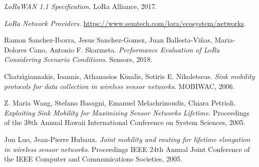 \documentclass[a4paper,12pt]{article}
\theoremstyle{definition}
\begin{document}
\begin{thebibliography}{0}

\textit{LoRaWAN 1.1 Specification}.
LoRa Alliance, 2017.

\textit{LoRa Network Providers}.
\url{https://www.semtech.com/lora/ecosystem/networks}.

Ramon Sanchez-Iborra, Jesus Sanchez-Gomez, Juan Ballesta-Viñas, Maria-Dolores Cano, Antonio F. Skarmeta.
\textit{Performance Evaluation of LoRa Considering Scenario Conditions}. 
Sensors, 2018.

Chatzigiannakis, Ioannis, Athanasios Kinalis, Sotiris E. Nikoletseas.
\textit{Sink mobility protocols for data collection in wireless sensor networks}.
MOBIWAC, 2006.

Z. Maria Wang, Stefano Basagni, Emanuel Melachrinoudis, Chiara Petrioli.
\textit{Exploiting Sink Mobility for Maximizing Sensor Networks Lifetime}.
Proceedings of the 38th Annual Hawaii International Conference on System Sciences, 2005.

Jun Luo, Jean-Pierre Hubaux.
\textit{Joint mobility and routing for lifetime elongation in wireless sensor networks}.
Proceedings IEEE 24th Annual Joint Conference of the IEEE Computer and Communications Societies, 2005.

\end{thebibliography}
\end{document}

